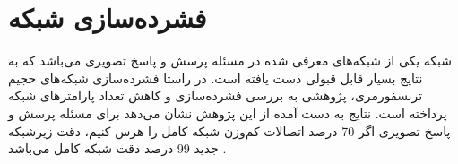 \section{فشرده‌سازی شبکه
	}
شبکه
\cite{chen2020uniter}
یکی از شبکه‌های معرفی شده در مسئله پرسش و پاسخ تصویری می‌باشد که به نتایج بسیار قابل قبولی دست یافته است. در راستا فشرده‌سازی شبکه‌های حجیم ترنسفورمری، پژوهشی به بررسی فشرده‌سازی و کاهش تعداد پارامتر‌های شبکه
پرداخته است. نتایج به دست آمده از این پژوهش نشان می‌دهد برای مسئله پرسش و پاسخ تصویری اگر 70 درصد اتصالات کم‌وزن شبکه کامل 
را هرس کنیم، دقت زیر‌شبکه جدید 99 درصد دقت شبکه کامل می‌باشد \cite{gan2021playing}.

